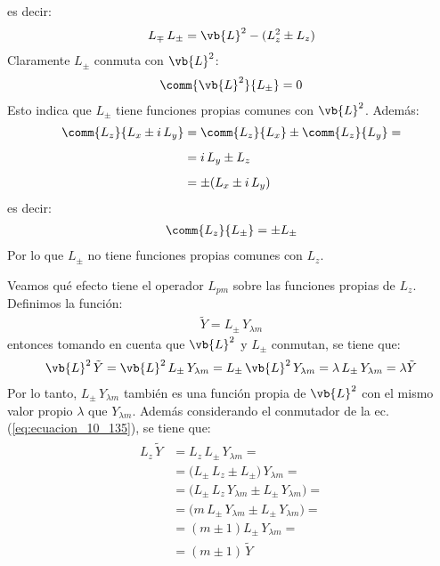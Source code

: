 es decir:
\begin{align}
L_{\mp} \, L_{\pm} = \vb{L}^{2} - (L_{z}^{2} \pm L_{z})
\label{eq:ecuacion_10_132}
\end{align}
Claramente $L_{\pm}$ conmuta con $\vb{L}^{2}$:
\begin{align}
\comm{\vb{L}^{2}}{L_{\pm}} = 0
\label{eq:ecuacion_10_133}
\end{align}
Esto indica que $L_{\pm}$ tiene funciones propias comunes con $\vb{L}^{2}$. Además:
\begin{align}
\begin{aligned}[b]
\comm{L_{z}}{L_{x} \pm i \, L_{y}} &= \comm{L_{z}}{L_{x}} \pm \comm{L_{z}}{L_{y}} = \\[0.5em]
&= i \, L_{y} \pm L_{z} \\[0.5em]
&= \pm (L_{x} \pm i \, L_{y}) 
\end{aligned}
\label{eq:ecuacion_10_134}
\end{align}
es decir:
\begin{align}
\comm{L_{z}}{L_{\pm}} = \pm L_{\pm}
\label{eq:ecuacion_10_135}
\end{align}
Por lo que $L_{\pm}$ no tiene funciones propias comunes con $L_{z}$.
\par
Veamos qué efecto tiene el operador $L_{pm}$ sobre las funciones propias de $L_{z}$. Definimos la función:
\begin{align}
\tilde{Y} = L_{\pm} \, Y_{\lambda m}
\label{eq:ecuacion_10_136}
\end{align}
entonces tomando en cuenta que $\vb{L}^{2}$ y $L_{\pm}$ conmutan, se tiene que:
\begin{align}
\vb{L}^{2} \, \tilde{Y} = \vb{L}^{2} \, L_{\pm} \, Y_{\lambda m} = L_{\pm} \, \vb{L}^{2} \, Y_{\lambda m} = \lambda \, L_{\pm} \, Y_{\lambda m} = \lambda \tilde{Y} 
\label{eq:ecuacion_10_137}
\end{align}
Por lo tanto, $L_{\pm} \, Y_{\lambda m}$ también es una función propia de $\vb{L}^{2}$ con el mismo valor propio $\lambda$ que $Y_{\lambda m}$. Además considerando el conmutador de la ec. (\ref{eq:ecuacion_10_135}), se tiene que:
\begin{align}
\begin{aligned}
L_{z} \, \tilde{Y} &= L_{z} \, L_{\pm} \, Y_{\lambda m} = \\[0.5em]
&= \big( L_{\pm} \, L_{z} \pm L_{\pm} \big) \, Y_{\lambda m} = \\[0.5em]
&= \big( L_{\pm} \, L_{z} \, Y_{\lambda m} \pm L_{\pm}  \, Y_{\lambda m} \big) = \\[0.5em]
&= \big( m \, L_{\pm} \, Y_{\lambda m} \pm L_{\pm} \, Y_{\lambda m} \big) = \\[0.5em]
&= (m \pm 1) L_{\pm} \, Y_{\lambda m} = \\[0.5em]
&= (m \pm  1) \, \tilde{Y}
\end{aligned}
\label{eq:ecuacion_10_138}
\end{align}
